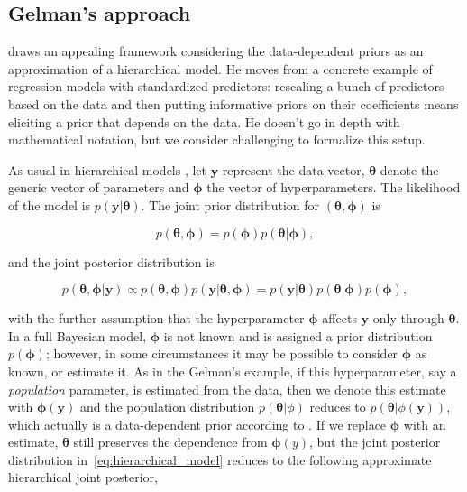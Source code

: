 \documentclass{statsoc}
\begin{document}
\subsection{Gelman's approach}
\label{sec:gelman}

\cite{gelmandatadependent} draws an appealing framework considering the data-dependent priors as an approximation of a hierarchical model. He moves from a concrete example of regression models with standardized predictors: rescaling a bunch of predictors based on the data and then putting informative priors on their coefficients means eliciting a prior that depends on the data. He doesn't go in depth with mathematical notation, but we consider challenging to formalize this setup.

As usual in hierarchical models \citep{gelman2014bayesian}, let $\bm{y}$ represent the data-vector, $\bm{\theta}$ denote the generic vector of parameters and $\bm{\phi}$ the vector of hyperparameters. The likelihood of the model is $p(\bm{y}|\bm{\theta})$. The joint prior distribution for $(\bm{\theta}, \bm{\phi}) $ is

$$p(\bm{\theta}, \bm{\phi})= p(\bm{\phi})p(\bm{\theta}|\bm{\phi}), $$

and the joint posterior distribution is 

\begin{equation}
 p(\bm{\theta}, \bm{\phi}|\bm{y}) \propto p(\bm{\theta}, \bm{\phi}) p(\bm{y}| \bm{\theta}, \bm{\phi})=p(\bm{y}| \bm{\theta})p(\bm{\theta}|\bm{\phi})p(\bm{\phi}),
 \label{eq:hierarchical_model}
 \end{equation}

with the further assumption that the hyperparameter $\bm{\phi}$ affects $\bm{y}$ only through $\bm{\theta}$. In a full Bayesian model, $\bm{\phi}$ is not known and is assigned a prior distribution $p(\bm{\phi})$; however, in some circumstances it may be possible to consider $\bm{\phi}$ as known, or estimate it. As in the Gelman's example, if this hyperparameter, say a \textit{population} parameter, is estimated from the data, then we denote this estimate with ${\bm{\phi}}(\bm{y})$ and the population distribution $p(\bm{\theta}|\phi)$ reduces to $p(\bm{\theta} | {\phi}(\bm{y}) )$, which actually is a data-dependent prior according to \cite{darnieder2011bayesian}.
If we replace $\bm{\phi}$ with an estimate, $\bm{\theta}$ still preserves the dependence from  ${\bm{\phi}}(y)$, but the joint posterior distribution in~\eqref{eq:hierarchical_model} reduces to the following approximate hierarchical joint posterior,
\end{document}
